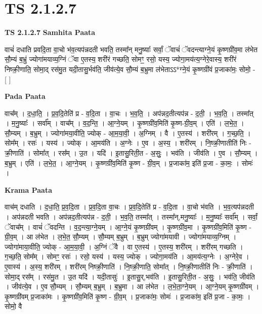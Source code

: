 \documentclass[17pt]{extarticle}
\begin{document}
\section*{ TS 2.1.2.7 }

\textbf{TS 2.1.2.7 } \newline
\textbf{Samhita Paata} \newline

वाचं॑ दधाति प्रवदि॒ता वा॒चो भ॑व॒त्यप॑न्नदती भवति॒ तस्मा᳚न् मनु॒ष्याः᳚ सर्वां॒ ॅवाचं॑ ॅवदन्त्याग्ने॒यं कृ॒ष्णग्री॑व॒मा ल॑भेत सौ॒म्यं ब॒भ्रुं ज्योगा॑मयाव्य॒ग्निं ॅवा ए॒तस्य॒ शरी॑रं गच्छति॒ सोमꣳ॒॒ रसो॒ यस्य॒ ज्योगा॒मय॑त्य॒ग्नेरे॒वास्य॒ शरी॑रं निष्क्री॒णाति॒ सोमा॒द् रस॑मु॒त यदी॒तासु॒र्भव॑ति॒ जीव॑त्ये॒व सौ॒म्यं ब॒भ्रुमा ल॑भेताऽऽ*ग्ने॒यं कृ॒ष्णग्री॑वं प्र॒जाका॑मः॒ सोमो॒ - [  ] \newline

\textbf{Pada Paata} \newline

वाच᳚म् । द॒धा॒ति॒ । प्र॒व॒दि॒तेति॑ प्र - व॒दि॒ता । वा॒चः । भ॒व॒ति॒ । अप॑न्नद॒तीत्यप॑न्न - द॒ती॒ । भ॒व॒ति॒ । तस्मा᳚त् । म॒नु॒ष्याः᳚ । सर्वा᳚म् । वाच᳚म् । व॒द॒न्ति॒ । आ॒ग्ने॒यम् । कृ॒ष्णग्री॑व॒मिति॑ कृ॒ष्ण-ग्री॒व॒म् । एति॑ । ल॒भे॒त॒ । सौ॒म्यम् । ब॒भ्रुम् । ज्योगा॑मया॒वीति॒ ज्योक् - आ॒म॒या॒वी॒ । अ॒ग्निम् । वै । ए॒तस्य॑ । शरी॑रम् । ग॒च्छ॒ति॒ । सोम᳚म् । रसः॑ । यस्य॑ । ज्योक् । आ॒मय॑ति । अ॒ग्नेः । ए॒व । अ॒स्य॒ । शरी॑रम् । नि॒ष्क्री॒णातीति॑ निः - क्री॒णाति॑ । सोमा᳚त् । रस᳚म् । उ॒त । यदि॑ । इ॒तासु॒रिती॒त - अ॒सुः॒ । भव॑ति । जीव॑ति । ए॒व । सौ॒म्यम् । ब॒भ्रुम् । एति॑ । ल॒भे॒त॒ । आ॒ग्ने॒यम् । कृ॒ष्णग्री॑व॒मिति॑ कृ॒ष्ण - ग्री॒व॒म् । प्र॒जाका॑म॒ इति॑ प्र॒जा - का॒मः॒ । सोमः॑ ।  \newline


\textbf{Krama Paata} \newline

वाच॑म् दधाति । द॒धा॒ति॒ प्र॒व॒दि॒ता । प्र॒व॒दि॒ता वा॒चः । प्र॒व॒दि॒तेति॑ प्र - व॒दि॒ता । वा॒चो भ॑वति । भ॒व॒त्यप॑न्नदती । अप॑न्नदती भवति । अप॑न्नद॒तीत्यप॑न्न - द॒ती॒ । भ॒व॒ति॒ तस्मा᳚त् । तस्मा᳚न्,मनु॒ष्याः᳚ । म॒नु॒ष्याः᳚ सर्वा᳚म् । सर्वां॒ ॅवाच᳚म् । वाचं॑ ॅवदन्ति । व॒द॒न्त्या॒ग्ने॒यम् । आ॒ग्ने॒यं कृ॒ष्णग्री॑वम् । कृ॒ष्णग्री॑व॒मा । कृ॒ष्णग्री॑व॒मिति॑ कृ॒ष्ण - ग्री॒व॒म् । आ ल॑भेत । ल॒भे॒त॒ सौ॒म्यम् । सौ॒म्यम् ब॒भ्रुम् । ब॒भ्रुम् ज्योगा॑मयावी । ज्योगा॑मयाव्य॒ग्निम् । ज्योगा॑माया॒वीति॒ ज्योक् - आ॒म॒या॒वी॒ । अ॒ग्निं ॅवै । वा ए॒तस्य॑ । ए॒तस्य॒ शरी॑रम् । शरी॑रम् गच्छति । ग॒च्छ॒ति॒ सोम᳚म् । सोमꣳ॒॒ रसः॑ । रसो॒ यस्य॑ । यस्य॒ ज्योक् । ज्योगा॒मय॑ति । आ॒मय॑त्य॒ग्नेः । अ॒ग्नेरे॒व । ए॒वास्य॑ । अ॒स्य॒ शरी॑रम् । शरी॑रम् निष्क्री॒णाति॑ । नि॒ष्क्री॒णाति॒ सोमा᳚त् । नि॒ष्क्री॒णातीति॑ निः - क्री॒णाति॑ । सोमा॒द् रस᳚म् । रस॑मु॒त । उ॒त यदि॑ । यदी॒तासुः॑ । इ॒तासु॒र्,भव॑ति । इ॒तासु॒रिती॒त - अ॒सुः॒ । भव॑ति॒ जीव॑ति । जीव॑त्ये॒व । ए॒व सौ॒म्यम् । सौ॒म्यम् ब॒भ्रुम् । ब॒भ्रुमा । आ ल॑भेत । ल॒भे॒ता॒ग्ने॒यम् । आ॒ग्ने॒यम् कृ॒ष्णग्री॑वम् । कृ॒ष्णग्री॑वम् प्र॒जाका॑मः । कृ॒ष्णग्री॑व॒मिति॑ कृ॒ष्ण - ग्री॒व॒म् । प्र॒जाका॑मः॒ सोमः॑ । प्र॒जाका॑म॒ इति॑ प्र॒जा - का॒मः॒ । सोमो॒ वै \newline
\end{document}
